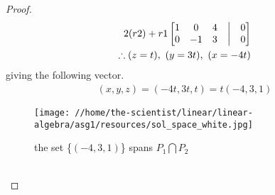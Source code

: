 \documentclass[12pt]{article}
\begin{document}
\begin{enumerate}
\begin{enumerate}
\begin{proof}
\begin{align*}
                                            2(r2)+r1
                                            \begin{bmatrix}
                                                    1 & 0  & 4 & \bigm| & 0 \\
                                                    0 & -1 & 3 & \bigm| & 0 \\
                                            \end{bmatrix} \\
                                            \therefore (z=t),\ (y=3t),\ (x=-4t)
                                    \end{align*}
                                    giving the following vector.
                                    \begin{align*}
                                            (x,y,z) = (-4t, 3t, t) = t(-4, 3, 1)
                                    \end{align*}
                                    \begin{figure}[htbp]
                                            \centering
                                            \texttt{[image: //home/the-scientist/linear/linear-algebra/asg1/resources/sol\_space\_white.jpg]}
                                            \caption{the set \{$(-4, 3, 1)$\} spans $P_1 \bigcap P_2$ \label{fig:solution space}}
                                    \end{figure} \\
                            \end{proof}
              \end{enumerate}
\end{enumerate}
\end{document}
